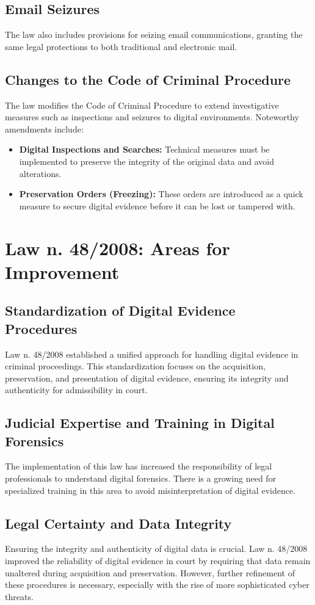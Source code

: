 \subsection{Email Seizures}
The law also includes provisions for seizing email communications, granting the same legal protections to both traditional and electronic mail.

\subsection{Changes to the Code of Criminal Procedure}
The law modifies the Code of Criminal Procedure to extend investigative measures such as inspections and seizures to digital environments. Noteworthy amendments include:
\begin{itemize}
    \item \textbf{Digital Inspections and Searches:} Technical measures must be implemented to preserve the integrity of the original data and avoid alterations.
    \item \textbf{Preservation Orders (Freezing):} These orders are introduced as a quick measure to secure digital evidence before it can be lost or tampered with.
\end{itemize}

\section{Law n. 48/2008: Areas for Improvement}

\subsection{Standardization of Digital Evidence Procedures}
Law n. 48/2008 established a unified approach for handling digital evidence in criminal proceedings. This standardization focuses on the acquisition, preservation, and presentation of digital evidence, ensuring its integrity and authenticity for admissibility in court.

\subsection{Judicial Expertise and Training in Digital Forensics}
The implementation of this law has increased the responsibility of legal professionals to understand digital forensics. There is a growing need for specialized training in this area to avoid misinterpretation of digital evidence.

\subsection{Legal Certainty and Data Integrity}
Ensuring the integrity and authenticity of digital data is crucial. Law n. 48/2008 improved the reliability of digital evidence in court by requiring that data remain unaltered during acquisition and preservation. However, further refinement of these procedures is necessary, especially with the rise of more sophisticated cyber threats.

